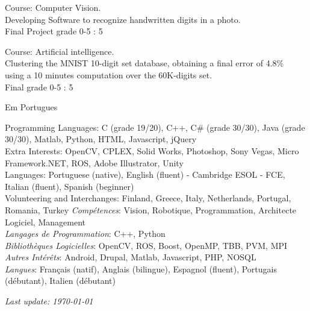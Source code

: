 \documentclass{article}
\begin{document}
\begin{llist}
{ 
Course: Computer Vision.\\
Developing Software to recognize handwritten digits in a photo.\\
Final Project grade 0-5 : 5

 
Course: Artificial intelligence.\\
Clustering the MNIST 10-digit set database, obtaining a final error of 4.8\%\\
using a 10 minutes computation over the 60K-digits set.\\
Final grade 0-5 : 5

}
{

Em Portugues

}

{
Programming Languages: C (grade 19/20), C++, C\# (grade 30/30), Java (grade 30/30), Matlab, Python, HTML, Javascript, jQuery\\
Extra Interests: OpenCV, CPLEX, Solid Works, Photoshop, Sony Vegas, Micro Framework.NET, ROS, Adobe Illustrator, Unity\\

Languages: Portuguese (native), English (fluent) - Cambridge ESOL - FCE, Italian (fluent), Spanish (beginner)\\
Volunteering and Interchanges: Finland, Greece, Italy, Netherlands, Portugal, Romania, Turkey
}
{
{\em Comp\'{e}tences}: Vision, Robotique, Programmation, Architecte Logiciel, Management\\
{\em Langages de Programmation}: C++, Python\\
{\em Biblioth\`{e}ques Logicielles}: OpenCV, ROS, Boost, OpenMP, TBB, PVM, MPI \\
{\em Autres Int\'{e}r\^{e}ts}: Android, Drupal, Matlab, Javascript, PHP, NOSQL \\
{\em Langues}: Fran\c{c}ais (natif), Anglais (bilingue), Espagnol (fluent), Portugais (d\'{e}butant), Italien
(d\'{e}butant)
}




\end{llist}

{\em Last update: \today}
\end{document}
